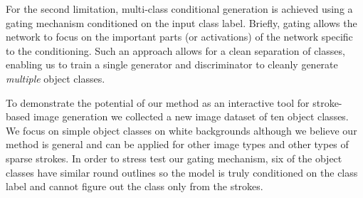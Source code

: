 For the second limitation, multi-class conditional generation is achieved using a gating mechanism conditioned on the input class label. Briefly, gating allows the network to focus on the important parts (or activations) of the network specific to the conditioning. Such an approach allows for a clean separation of classes, enabling us to train a single generator and discriminator to cleanly generate \emph{multiple} object classes. %

To demonstrate the potential of our method as an interactive tool for stroke-based image generation we collected a new image dataset of ten object classes. We focus on simple object classes on white backgrounds although we believe our method is general and can be applied for other image types and other types of sparse strokes. In order to stress test our gating mechanism, six  of the object classes have similar round outlines so the model is truly conditioned on the class label and cannot figure out the class only from the strokes. 



